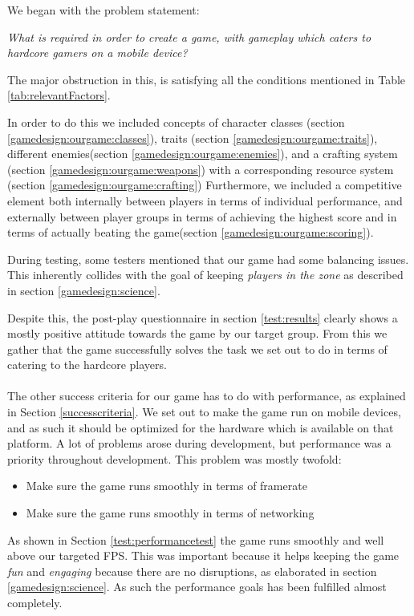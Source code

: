 We began with the problem statement:
\begin{center}
\textit{What is required in order to create a game, with gameplay which caters to hardcore gamers on a mobile device?}
\end{center}

The major obstruction in this, is satisfying all the conditions mentioned in Table \ref{tab:relevantFactors}.

In order to do this we included concepts of character classes (section \ref{gamedesign:ourgame:classes}), traits (section \ref{gamedesign:ourgame:traits}), different enemies(section \ref{gamedesign:ourgame:enemies}), and a crafting system (section \ref{gamedesign:ourgame:weapons}) with a corresponding resource system (section \ref{gamedesign:ourgame:crafting})
Furthermore, we included a competitive element both internally between players in terms of individual performance, and externally between player groups in terms of achieving the highest score and in terms of actually beating the game(section \ref{gamedesign:ourgame:scoring}).

During testing, some testers mentioned that our game had some balancing issues. 
This inherently collides with the goal of keeping \emph{players in the zone} as described in section \ref{gamedesign:science}. 

Despite this, the post-play questionnaire in section \ref{test:results} clearly shows a mostly positive attitude towards the game by our target group.
From this we gather that the game successfully solves the task we set out to do in terms of catering to the hardcore players.\\\\
The other success criteria for our game has to do with performance, as explained in Section \ref{successcriteria}.
We set out to make the game run on mobile devices, and as such it should be optimized for the hardware which is available on that platform. 
A lot of problems arose during development, but performance was a priority throughout development. 
This problem was mostly twofold:

\begin{itemize}
\item Make sure the game runs smoothly in terms of framerate 
\item Make sure the game runs smoothly in terms of networking
\end{itemize}

As shown in Section \ref{test:performancetest} the game runs smoothly and well above our targeted FPS.
This was important because it helps keeping the game \emph{fun} and \emph{engaging} because there are no disruptions, as elaborated in section \ref{gamedesign:science}.
As such the performance goals has been fulfilled almost completely.